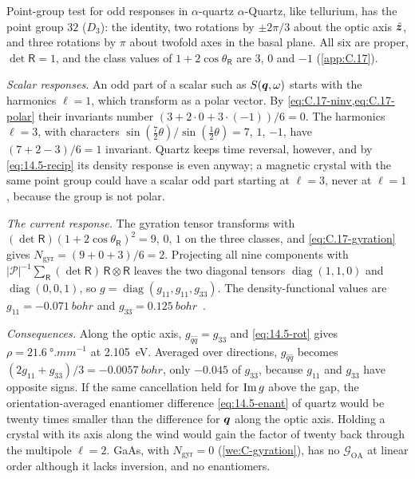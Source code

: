 \begin{workedexample}{Point-group test for odd responses in $\alpha$-quartz}\label{we:14-quartz}
$\alpha$-Quartz, like tellurium, has the point group $32$ ($D_3$): the identity, two rotations by $\pm2\pi/3$ about the optic axis $\hat{\bm{z}}$, and three rotations by $\pi$ about twofold axes in the basal plane. All six are proper, $\det\mathsf{R} = 1$, and the class values of $1 + 2\cos\theta_{\mathsf{R}}$ are $3$, $0$ and $-1$ (\cref{app:C.17}).

\emph{Scalar responses.} An odd part of a scalar such as $S(\bm{q},\omega)$ starts with the harmonics $\ell = 1$, which transform as a polar vector. By \cref{eq:C.17-ninv,eq:C.17-polar} their invariants number $(3 + 2\cdot0 + 3\cdot(-1))/6 = 0$. The harmonics $\ell = 3$, with characters $\sin(\frac72\theta)/\sin(\frac12\theta) = 7$, $1$, $-1$, have $(7 + 2 - 3)/6 = 1$ invariant. Quartz keeps time reversal, however, and by \cref{eq:14.5-recip} its density response is even anyway; a magnetic crystal with the same point group could have a scalar odd part starting at $\ell = 3$, never at $\ell = 1$, because the group is not polar.

\emph{The current response.} The gyration tensor transforms with $(\det\mathsf{R})(1 + 2\cos\theta_{\mathsf{R}})^2 = 9$, $0$, $1$ on the three classes, and \cref{eq:C.17-gyration} gives $N_{\mathrm{gyr}} = (9 + 0 + 3)/6 = 2$. Projecting all nine components with $|\mathcal{P}|^{-1}\sum_{\mathsf{R}}(\det\mathsf{R})\,\mathsf{R}\otimes\mathsf{R}$ leaves the two diagonal tensors $\operatorname{diag}(1,1,0)$ and $\operatorname{diag}(0,0,1)$, so $g = \operatorname{diag}(g_{11}, g_{11}, g_{33})$. The density-functional values are $g_{11} = \SI{-0.071}{bohr}$ and $g_{33} = \SI{0.125}{bohr}$~\cite[Table~I]{zabalo2023natural}.

\emph{Consequences.} Along the optic axis, $g_{\hat q\hat q} = g_{33}$ and \cref{eq:14.5-rot} gives $\rho = \SI{21.6}{\degree.mm^{-1}}$ at \SI{2.105}{eV}. Averaged over directions, $g_{\hat q\hat q}$ becomes $(2g_{11} + g_{33})/3 = \SI{-0.0057}{bohr}$, only $-0.045$ of $g_{33}$, because $g_{11}$ and $g_{33}$ have opposite signs. If the same cancellation held for $\operatorname{Im} g$ above the gap, the orientation-averaged enantiomer difference \cref{eq:14.5-enant} of quartz would be twenty times smaller than the difference for $\bm{q}$ along the optic axis. Holding a crystal with its axis along the wind would gain the factor of twenty back through the multipole $\ell = 2$. GaAs, with $N_{\mathrm{gyr}} = 0$ (\cref{we:C-gyration}), has no $\boldsymbol{\mathcal{G}}_{\mathrm{OA}}$ at linear order although it lacks inversion, and no enantiomers.
\end{workedexample}

